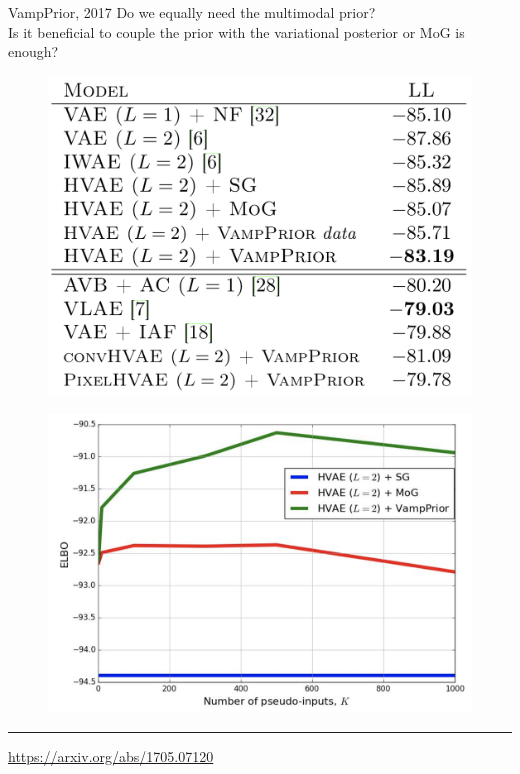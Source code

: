 \documentclass{beamer}
\begin{document}
\begin{frame}{VampPrior, 2017}
	Do we equally need the multimodal prior? \\
	\vspace{0.2cm}
	Is it beneficial to couple the prior with the variational posterior or MoG is enough?
	\begin{minipage}[t]{0.5\columnwidth}
		\begin{figure}[h]
			\centering
			\includegraphics[width=1.\linewidth]{figs/VampPrior_1.png}
		\end{figure}
	\end{minipage}%
	\begin{minipage}[t]{0.5\columnwidth}
		\begin{figure}[h]
			\centering
			\includegraphics[width=1.\linewidth]{figs/VampPrior_2.png}
		\end{figure}
	\end{minipage}
	\vfill
	\hrule\medskip
	{\scriptsize \href{https://arxiv.org/abs/1705.07120}{https://arxiv.org/abs/1705.07120}}
\end{frame}
\end{document}
